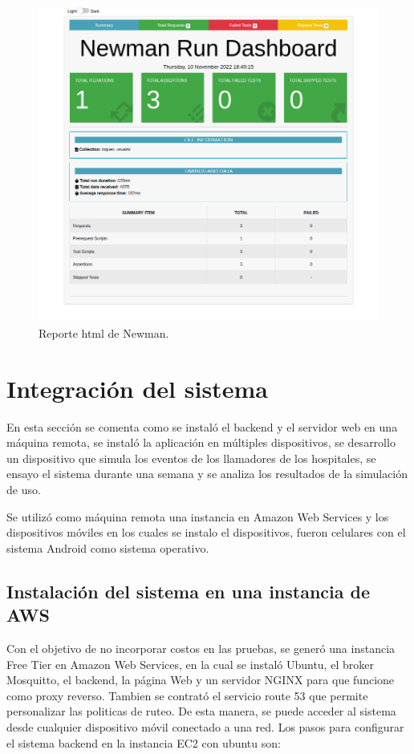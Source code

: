\begin{figure}[ht]
	\centering
	\includegraphics[scale=.35]{./Figures/newman-2.png}
	\caption{Reporte html de Newman.}
	\label{fig:reporte html Newman}
\end{figure}



\pagebreak

\section{Integración del sistema}
\label{Integración del sistema}

En esta sección se comenta como se instaló el backend y el servidor web en una máquina remota, se instaló la aplicación en múltiples dispositivos, se desarrollo un dispositivo que simula los eventos de los llamadores de los hospitales, se ensayo el sistema durante una semana y se analiza los resultados de la simulación de uso.

Se utilizó como máquina remota una instancia en Amazon Web Services y los dispositivos móviles en los cuales se instalo el dispositivos, fueron celulares con el sistema Android como sistema operativo.

\subsection{Instalación del sistema en una instancia de AWS}
Con el objetivo de no incorporar costos en las pruebas, se generó una instancia Free Tier en Amazon Web Services, en la cual se instaló Ubuntu, el broker Mosquitto, el backend, la página Web y un servidor NGINX para que funcione como proxy reverso. Tambien se contrató el servicio route 53 que permite personalizar las politicas de ruteo.
De esta manera, se puede acceder al sistema desde cualquier dispositivo móvil conectado a una red.
Los pasos para configurar el sistema backend en la instancia EC2 con ubuntu son:

